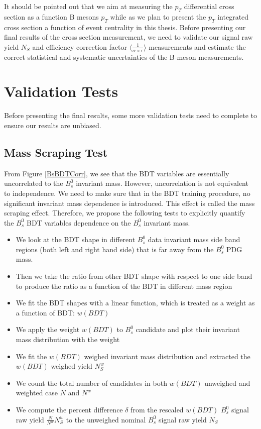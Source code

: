 It should be pointed out that we aim at measuring the $p_T$ differential cross section as a function B mesons $p_T$ while as we plan to present the $p_T$ integrated cross section a function of event centrality in this thesis. Before presenting our final results of the cross section measurement, we need to validate our signal raw yield $N_S$ and efficiency correction factor $\langle\frac{1}{\alpha \times \epsilon} \rangle$ measurements and estimate the correct statistical and systematic uncertainties of the B-meson measurements. 

\section{Validation Tests} 

Before presenting the final results, some more validation tests need to complete to ensure our results are unbiased.

\subsection{Mass Scraping Test}

From Figure \ref{BsBDTCorr}, we see that the BDT variables are essentially uncorrelated to the $B^0_s$ invariant mass. However, uncorrelation is not equivalent to independence. We need to make sure that in the BDT training procedure, no significant invariant mass dependence is introduced. This effect is called the mass scraping effect. Therefore, we propose the following tests to explicitly quantify the $B^0_s$ BDT variables dependence on the $B^0_s$ invariant mass. 

\begin{itemize}
\item We look at the BDT shape in different $B^0_s$ data invariant mass side band regions (both left and right hand side) that is far away from the $B^0_s$ PDG mass.
\item Then we take the ratio from other BDT shape with respect to one side band to produce the ratio as a function of the BDT in different mass region
\item We fit the BDT shapes with a linear function, which is treated as a weight as a function of BDT: $w(BDT)$
\item We apply the weight $w(BDT)$ to $B^0_s$ candidate and plot their invariant mass distribution with the weight
\item We fit the $w(BDT)$ weighed invariant mass distribution and extracted the $w(BDT)$ weighed yield $N^{w}_S$
\item We count the total number of candidates in both $w(BDT)$ unweighed and weighted case $N$ and $N^{w}$
\item We compute the percent difference $\delta$ from the rescaled $w(BDT)$ $B^0_s$ signal raw yield $\frac{N}{N^{w}} N^{w}_S$ to the unweighed nominal $B^0_s$ signal raw yield $N_S$
\end{itemize}

